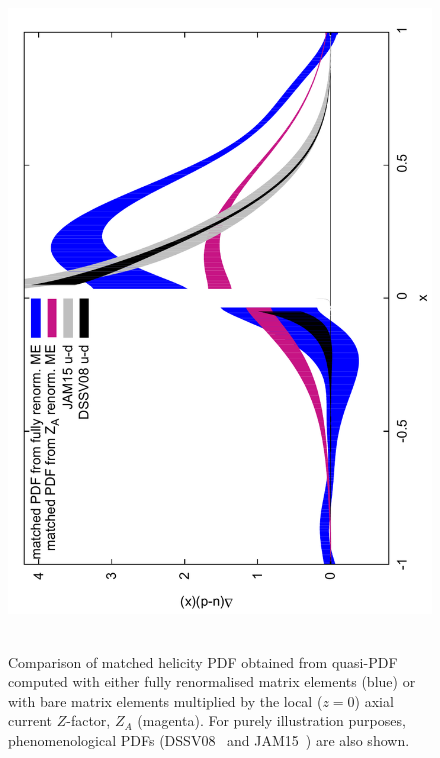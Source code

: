 \begin{figure}[!t]
\centering
\includegraphics[scale=0.4,angle=-90]{plots/qmatched_bare_vs_fit69v2}\,\,\,
\vspace*{-0.3cm}
\begin{minipage}{15cm}
\hspace*{3cm}
\caption{\small Comparison of matched helicity PDF obtained from quasi-PDF 
computed with either fully renormalised matrix elements (blue) 
or with bare matrix elements multiplied by the local ($z{=}0$) 
axial current $Z$-factor, $Z_A$ (magenta). For purely illustration purposes, 
phenomenological PDFs (DSSV08~\cite{deFlorian:2009vb} and 
JAM15~\cite{Sato:2016tuz}) are also shown.}
\label{fig:matched} 
\end{minipage}
\end{figure}
